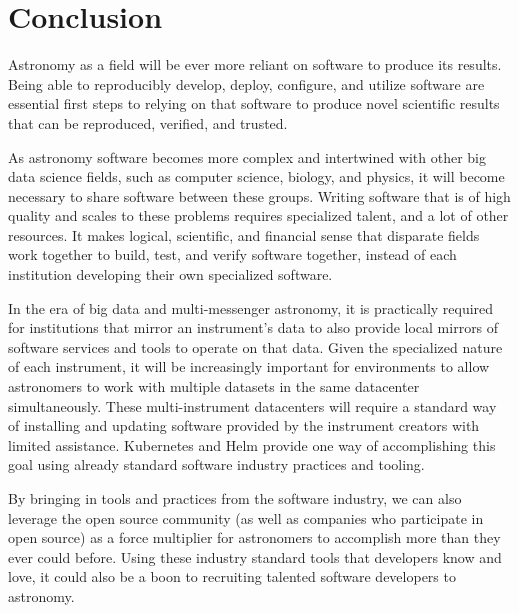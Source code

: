 \documentclass[11pt,twoside]{article}
\begin{document}
\section{Conclusion}

Astronomy as a field will be ever more reliant on software to produce its results.
Being able to reproducibly develop, deploy, configure, and utilize software are
essential first steps to relying on that software to produce novel scientific
results that can be reproduced, verified, and trusted.

As astronomy software becomes more complex and intertwined with other big
data science fields, such as computer science, biology, and physics, it will
become necessary to share software between these groups.  Writing software that
is of high quality and scales to these problems requires specialized talent,
and a lot of other resources.  It makes logical, scientific, and financial
sense that disparate fields work together to build, test, and verify software
together, instead of each institution developing their own specialized software.

In the era of big data and multi-messenger astronomy, it is practically required
for institutions that mirror an instrument's data to also provide local mirrors
of software services and tools to operate on that data.  Given the specialized
nature of each instrument, it will be increasingly important for environments
to allow astronomers to work with multiple datasets in the same datacenter
simultaneously.  These multi-instrument datacenters will require a standard
way of installing and updating software provided by the instrument creators
with limited assistance. Kubernetes and Helm provide one way of accomplishing
this goal using already standard software industry practices and tooling.

By bringing in tools and practices from the software industry, we can also
leverage the open source community (as well as companies who participate in
open source) as a force multiplier for astronomers to accomplish
more than they ever could before. Using these industry standard tools that
developers know and love, it could also be a boon to recruiting talented
software developers to astronomy.




\end{document}
